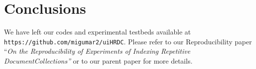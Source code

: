 \documentclass[review]{elsarticle}
\newcommand{\repair}{Re-Pair}
\newcommand{\repairNo}{\texttt{RePair}}
\newcommand{\rlcsa}{\texttt{RLCSA}}
\newcommand{\wcsa}{\texttt{WCSA}}
\newcommand{\slp}{\texttt{SLP}}
\newcommand{\wslp}{\texttt{WSLP}}
\newcommand{\lzindex}{\texttt{LZ77-index}}
\newcommand{\lzendindex}{\texttt{LZend-index}}
\begin{document}
%




\section{Conclusions}


We have left our codes and experimental testbeds available at
{\tt https://github.com/migumar2/uiHRDC}.
Please refer to our Reproducibility paper {``\em On the Reproducibility of Experiments of Indexing Repetitive DocumentCollections''} or to our parent paper \cite{CFMNis16.3} for more details.




\end{document}
